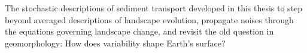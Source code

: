 The stochastic descriptions of sediment transport developed in this thesis \DIFdelbegin {}\DIFdelend \DIFaddbegin {}\DIFaddend to step beyond averaged descriptions of landscape evolution, propagate noises through the equations governing landscape change, and revisit the old question in geomorphology: How does variability shape Earth's surface?


